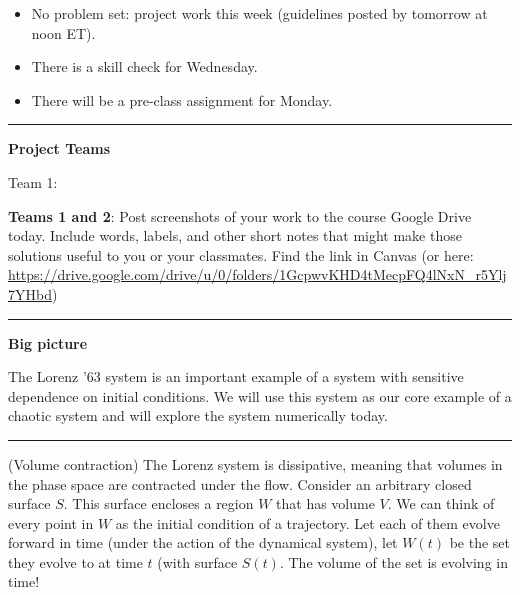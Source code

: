 \documentclass[12pt,letterpaper,noanswers]{exam}
\begin{document}
 \pdfpageheight 11in 
  \pdfpagewidth 8.5in

\noindent 




\begin{itemize}
\item No problem set: project work this week (guidelines posted by tomorrow at noon ET).
\item There is a skill check for Wednesday.
\item There will be a pre-class assignment for Monday.
\end{itemize}

\hrule
\vspace{0.2cm}



\noindent\textbf{Project Teams}

Team 1: 


\noindent \textbf{Teams 1 and 2}: Post screenshots of your work to the course Google Drive today.  Include words, labels, and other short notes that might make those solutions useful to you or your classmates.  Find the link in Canvas (or here: \url{https://drive.google.com/drive/u/0/folders/1GcpwvKHD4tMecpFQ4lNxN_r5Ylj7YHbd})


\vspace{0.2cm}

\hrule
\vspace{0.2cm}


\noindent\textbf{Big picture}

The Lorenz '63 system is an important example of a system with sensitive dependence on initial conditions.  We will use this system as our core example of a chaotic system and will explore the system numerically today.

\vspace{0.2cm}
\hrule
\vspace{0.2cm}



(Volume contraction) The Lorenz system is dissipative, meaning that volumes in the phase space are contracted under the flow.  Consider an arbitrary closed surface $S$.  This surface encloses a region $W$ that has volume $V$.  We can think of every point in $W$ as the initial condition of a trajectory.  Let each of them evolve forward in time (under the action of the dynamical system), let $W(t)$ be the set they evolve to at time $t$ (with surface $S(t)$.  The volume of the set is evolving in time!

\end{document}
